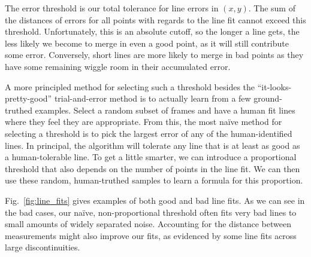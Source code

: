 \documentclass[12pt]{article}
\begin{document}
The error threshold is our total tolerance for line errors in $(x,y)$. The sum of
the distances of errors for all points with regards to the line fit cannot exceed this
threshold. Unfortunately, this is an absolute cutoff, so the longer a line gets,
the less likely we become to merge in even a good point, as it will still contribute
some error. Conversely, short lines are more likely to merge in bad points as they
have some remaining wiggle room in their accumulated error.

A more principled method for selecting such a threshold besides the ``it-looks-pretty-good''
trial-and-error method is to actually learn from a few ground-truthed examples. Select
a random subset of frames and have a human fit lines where they feel they are appropriate.
From this, the most na\"{i}ve method for selecting a threshold is to pick the largest error
of any of the human-identified lines. In principal, the algorithm will tolerate any line
that is at least as good as a human-tolerable line. To get a little smarter, we can
introduce a proportional threshold that also depends on the number of points in the line fit.
We can then use these random, human-truthed samples to learn a formula for this proportion.

Fig.~\ref{fig:line_fits} gives examples of both good and bad line fits. As we can see in the
bad cases, our na\"{i}ve, non-proportional threshold often fits very bad lines to small amounts
of widely separated noise. Accounting for the distance between measurements might also
improve our fits, as evidenced by some line fits across large discontinuities.
\end{document}
